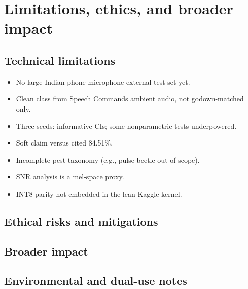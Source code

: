 \section{Limitations, ethics, and broader impact}
\label{sec:limitations}

\subsection{Technical limitations}
\begin{itemize}[leftmargin=*]
  \item No large Indian phone-microphone external test set yet.
  \item Clean class from Speech Commands ambient audio, not godown-matched only.
  \item Three seeds: informative CIs; some nonparametric tests underpowered.
  \item Soft claim versus cited 84.51\%.
  \item Incomplete pest taxonomy (e.g., pulse beetle out of scope).
  \item SNR analysis is a mel-space proxy.
  \item INT8 parity not embedded in the lean Kaggle kernel.
\end{itemize}

\subsection{Ethical risks and mitigations}

\subsection{Broader impact}

\subsection{Environmental and dual-use notes}
